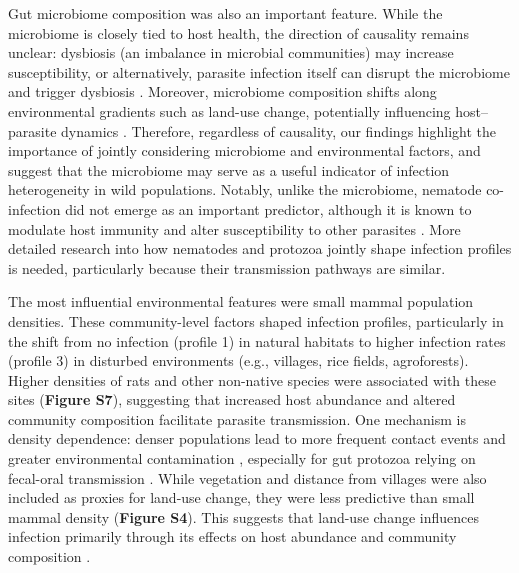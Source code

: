 \documentclass[oneside, a4paper, onecolumn, 11pt]{article}
\begin{document}
Gut microbiome composition was also an important feature. While the microbiome is closely tied to host health, the direction of causality remains unclear: dysbiosis (an imbalance in microbial communities) may increase susceptibility, or alternatively, parasite infection itself can disrupt the microbiome and trigger dysbiosis \citep{Levy2017-ec, Brussow2020-st}. Moreover, microbiome composition shifts along environmental gradients such as land-use change, potentially influencing host–parasite dynamics \citep{Markfeld2025-po, Bernardo-Cravo2020-yr}. Therefore, regardless of causality, our findings highlight the importance of jointly considering microbiome and environmental factors, and suggest that the microbiome may serve as a useful indicator of infection heterogeneity in wild populations. Notably, unlike the microbiome, nematode co-infection did not emerge as an important predictor, although it is known to modulate host immunity and alter susceptibility to other parasites \citep{Keegan2024-ts,Ezenwa2016-dq}. More detailed research into how nematodes and protozoa jointly shape infection profiles is needed, particularly because their transmission pathways are similar.

The most influential environmental features were small mammal population densities. These community-level factors shaped infection profiles, particularly in the shift from no infection (profile 1) in natural habitats to higher infection rates (profile 3) in disturbed environments (e.g., villages, rice fields, agroforests). Higher densities of rats and other non-native species were associated with these sites (\textbf{Figure S7}), suggesting that increased host abundance and altered community composition facilitate parasite transmission. One mechanism is density dependence: denser populations lead to more frequent contact events and greater environmental contamination \citep{Gajewski2024-wb}, especially for gut protozoa relying on fecal-oral transmission \citep{Sulaiman2025-ss}. While vegetation and distance from villages were also included as proxies for land-use change, they were less predictive than small mammal density (\textbf{Figure S4}). This suggests that land-use change influences infection primarily through its effects on host abundance and community composition \citep{Budria2014-xu}.
\end{document}
